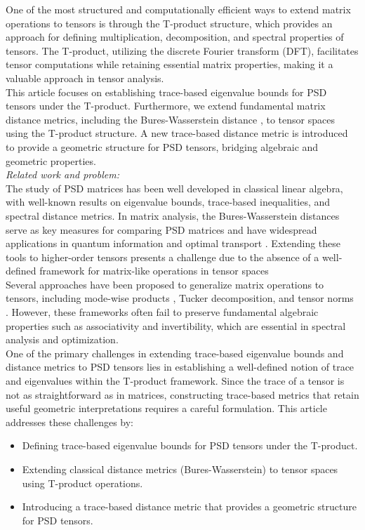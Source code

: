 \documentclass[oupthm]{CUP-JNL-BCM}%
\theoremstyle{oupplain}
\theoremstyle{oupdefinition}
\theoremstyle{oupremark}
\theoremstyle{oupproof}
\numberwithin{equation}{section}
\begin{document}
\noindent One of the most structured and computationally efficient ways to extend matrix operations to tensors is through the T-product \cite{kathrinLund} structure, which provides an approach for defining multiplication, decomposition, and spectral properties of tensors. The T-product, utilizing the discrete Fourier transform (DFT), facilitates tensor computations while retaining essential matrix properties, making it a valuable approach in tensor analysis.\\[-1ex]

\noindent This article focuses on establishing trace-based eigenvalue bounds for PSD tensors under the T-product. Furthermore, we extend fundamental matrix distance metrics, including the Bures-Wasserstein distance \cite{bures}, to tensor spaces using the T-product structure. A new trace-based distance metric is introduced to provide a geometric structure for PSD tensors, bridging algebraic and geometric properties.\\[-1ex]

\noindent \emph{Related work and problem:~}\\The study of PSD matrices has been well developed in classical linear algebra, with well-known results on eigenvalue bounds, trace-based inequalities, and spectral distance metrics. In matrix analysis, the Bures-Wasserstein distances serve as key measures for comparing PSD matrices and have widespread applications in quantum information \cite{quantaminform} and optimal transport \cite{optimal}. Extending these tools to higher-order tensors presents a challenge due to the absence of a well-defined framework for matrix-like operations in tensor spaces\\[-1ex]

\noindent Several approaches have been proposed to generalize matrix operations to tensors, including mode-wise products \cite{tensormmode}, Tucker decomposition, and tensor norms \cite{numerical}. However, these frameworks often fail to preserve fundamental algebraic properties such as associativity and invertibility, which are essential in spectral analysis and optimization.\\[-1ex]


\noindent One of the primary challenges in extending trace-based eigenvalue bounds and distance metrics to PSD tensors lies in establishing a well-defined notion of trace and eigenvalues within the T-product framework. Since the trace of a tensor is not as straightforward as in matrices, constructing trace-based metrics that retain useful geometric interpretations requires a careful formulation. This article addresses these challenges by:
\begin{itemize}
    \item Defining trace-based eigenvalue bounds for PSD tensors under the T-product.
    \item Extending classical distance metrics (Bures-Wasserstein) to tensor spaces using T-product operations.
    \item Introducing a trace-based distance metric that provides a geometric structure for PSD tensors.
\end{itemize}
\end{document}
